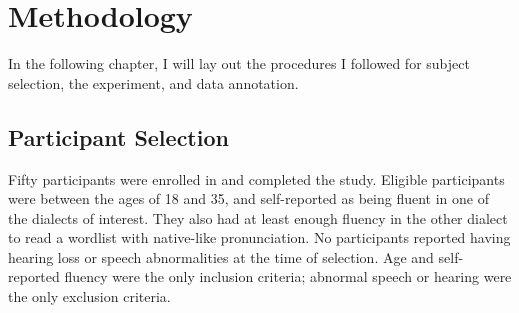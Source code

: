 \chapter{Methodology}
% 
% 
\label{methodchapter}
In the following chapter, I will lay out the procedures I followed for subject selection, the experiment, and data annotation.

\section{Participant Selection}
\label{sec:subjsel}
Fifty participants were enrolled in and completed the study. Eligible participants were between the ages of 18 and 35, and self-reported as being fluent in one of the dialects of interest.
% 
% 
% 
%
% 
% 
% 
%
They also had at least enough fluency in the other dialect to read a wordlist with native-like pronunciation. No participants reported having  hearing loss or speech abnormalities at the time of selection. Age and self-reported fluency were the only inclusion criteria; abnormal speech or hearing were the only exclusion criteria.%
% 
% 

